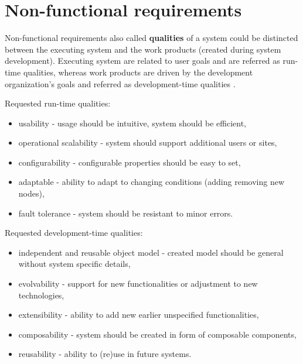 \documentclass[11pt]{book}
\begin{document}
    \section{Non-functional requirements}
    \label{sec:req:nonfunc}


      Non-functional requirements also called \textbf{qualities} of a system could be distincted between the executing
      system and the work products (created during system development). Executing system are related to user goals and
      are referred as run-time qualities, whereas work products are driven by the development organization’s goals and
      referred as development-time qualities \cite{nonfunctional}.

      \medskip

      Requested run-time qualities:

      \begin{itemize}
        \item usability - usage should be intuitive, system should be efficient,
        \item operational scalability - system should support additional users or sites,
        \item configurability - configurable properties should be easy to set,
        \item adaptable - ability to adapt to changing conditions (adding removing new nodes),
        \item fault tolerance - system should be resistant to minor errors.
      \end{itemize}

      \medskip

      Requested development-time qualities:

      \begin{itemize}
        \item independent and reusable object model - created model should be general without system specific details,
        \item evolvability - support for new functionalities or adjustment to new technologies,
        \item extensibility - ability to add new earlier unspecified functionalities,
        \item composability - system should be created in form of composable components,
        \item reusability - ability to (re)use in future systems.
      \end{itemize}
\end{document}
